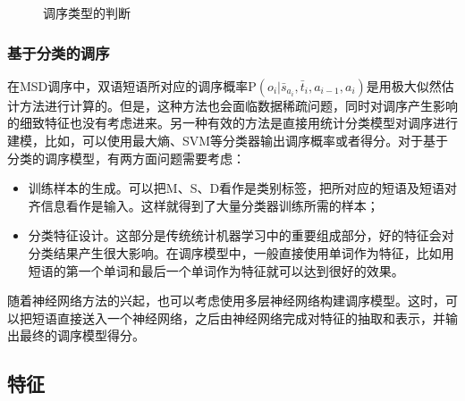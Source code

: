 \begin{figure}[htp]
\centering

\caption{调序类型的判断}
\label{fig:4-22}
\end{figure}
\vspace{1.0em}

\subsubsection{基于分类的调序}

\parinterval 在MSD调序中，双语短语所对应的调序概率$\textrm{P}(o_i| \bar{s}_{a_i}, \bar{t}_i, a_{i-1}, a_i)$是用极大似然估计方法进行计算的。但是，这种方法也会面临数据稀疏问题，同时对调序产生影响的细致特征也没有考虑进来。另一种有效的方法是直接用统计分类模型对调序进行建模，比如，可以使用最大熵、SVM等分类器输出调序概率或者得分\cite{xiong2006maximum,DBLP:journals/coling/OchN04,DBLP:conf/naacl/KumarB05}。对于基于分类的调序模型，有两方面问题需要考虑：

\begin{itemize}
\vspace{0.5em}
\item 训练样本的生成。可以把M、S、D看作是类别标签，把所对应的短语及短语对齐信息看作是输入。这样就得到了大量分类器训练所需的样本；
\vspace{0.5em}
\item 分类特征设计。这部分是传统统计机器学习中的重要组成部分，好的特征会对分类结果产生很大影响。在调序模型中，一般直接使用单词作为特征，比如用短语的第一个单词和最后一个单词作为特征就可以达到很好的效果。
\vspace{0.5em}
\end{itemize}

\parinterval 随着神经网络方法的兴起，也可以考虑使用多层神经网络构建调序模型\cite{li-etal-2014-neural}。这时，可以把短语直接送入一个神经网络，之后由神经网络完成对特征的抽取和表示，并输出最终的调序模型得分。


\subsection{特征}


